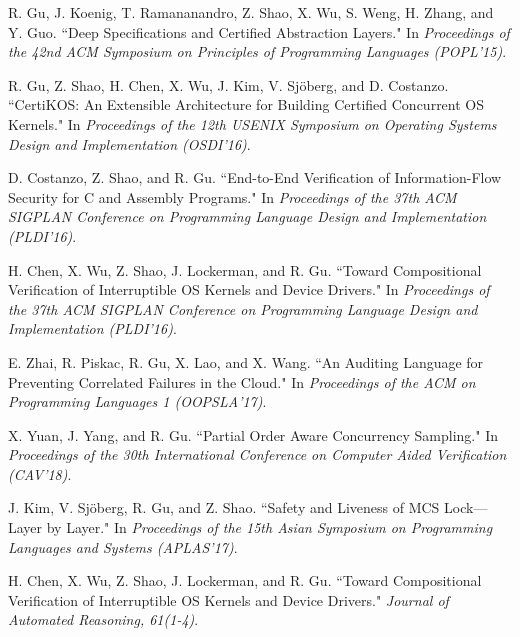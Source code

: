 \documentclass[a4paper, 10pt]{article}
\begin{document}
\begin{footnotesize}
\begin{thebibliography}{}




R. Gu, J. Koenig, T. Ramananandro, Z. Shao, X. Wu, S. Weng, H. Zhang, and Y. Guo. ``Deep Specifications and Certified Abstraction Layers." In
\emph{Proceedings of the 42nd ACM Symposium on Principles of Programming
Languages (POPL'15)}.

R. Gu, Z. Shao, H. Chen, X. Wu, J. Kim, V. Sj\"{o}berg, and D. Costanzo. ``CertiKOS: An Extensible Architecture for Building Certified Concurrent OS Kernels." In \emph{Proceedings of the 12th USENIX Symposium on Operating Systems Design and Implementation (OSDI'16)}. 

D. Costanzo,  Z. Shao, and R. Gu. ``End-to-End Verification of Information-Flow Security for C and Assembly Programs." In 
\emph{Proceedings of the 37th ACM SIGPLAN Conference on Programming Language Design and Implementation (PLDI'16)}.

H. Chen,  X. Wu, Z. Shao, J. Lockerman, and R. Gu. ``Toward Compositional Verification of Interruptible OS Kernels and Device Drivers." In \emph{Proceedings of the 37th ACM SIGPLAN Conference on Programming Language Design and Implementation (PLDI'16)}.

E. Zhai, R. Piskac, R. Gu, X. Lao, and X. Wang. ``An Auditing Language for Preventing Correlated Failures in the Cloud." In \emph{Proceedings of the ACM on Programming Languages  1 (OOPSLA'17)}.

X. Yuan, J. Yang, and R. Gu. ``Partial Order Aware Concurrency Sampling." In \emph{Proceedings of the 30th International Conference on Computer Aided Verification (CAV'18)}.

J. Kim, V. Sjöberg, R. Gu, and Z. Shao. ``Safety and Liveness of MCS Lock---Layer by Layer."
In \emph{Proceedings of the 15th Asian Symposium on Programming Languages and Systems (APLAS'17)}.

H. Chen,  X. Wu, Z. Shao, J. Lockerman, and R. Gu. ``Toward Compositional Verification of Interruptible OS Kernels and Device Drivers." \emph{Journal of Automated Reasoning, 61(1-4)}.



\end{thebibliography}
\end{footnotesize}
\end{document}
